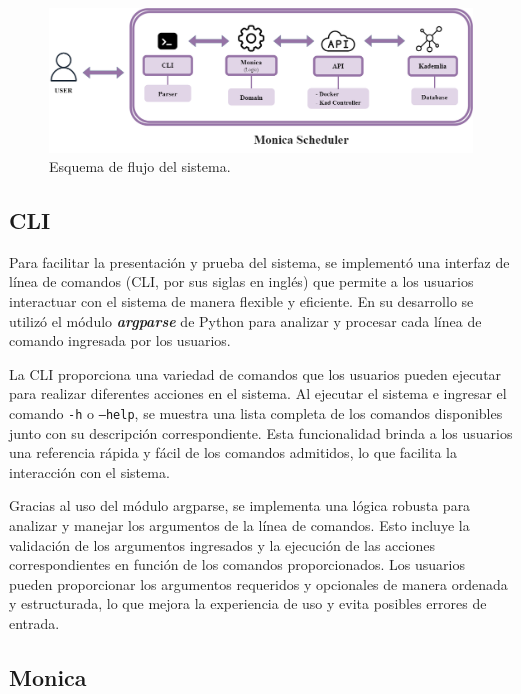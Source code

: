 \documentclass[10pt]{article} %
\begin{document}
	\begin{center}
		\begin{figure}[h]
			\includegraphics[scale=0.4]{esquema}
			\caption{Esquema de flujo del sistema.}
			\label{esquema}
		\end{figure}
		
	\end{center}
	
	\subsection{CLI}
	
	Para facilitar la presentación y prueba del sistema, se implementó una interfaz de línea de comandos (CLI, por sus siglas en inglés) que permite a los usuarios interactuar con el sistema de manera flexible y eficiente. En su desarrollo se utilizó el módulo \textit{\textbf{argparse}} de Python para analizar y procesar cada línea de comando ingresada por los usuarios.
	
	La CLI proporciona una variedad de comandos que los usuarios pueden ejecutar para realizar diferentes acciones en el sistema. Al ejecutar el sistema e ingresar el comando \texttt{-h} o \texttt{---}\texttt{help}, se muestra una lista completa de los comandos disponibles junto con su descripción correspondiente. Esta funcionalidad brinda a los usuarios una referencia rápida y fácil de los comandos admitidos, lo que facilita la interacción con el sistema.
	
	Gracias al uso del módulo argparse, se implementa una lógica robusta para analizar y manejar los argumentos de la línea de comandos. Esto incluye la validación de los argumentos ingresados y la ejecución de las acciones correspondientes en función de los comandos proporcionados. Los usuarios pueden proporcionar los argumentos requeridos y opcionales de manera ordenada y estructurada, lo que mejora la experiencia de uso y evita posibles errores de entrada.
	
	\subsection{Monica}	
	
\end{document}
